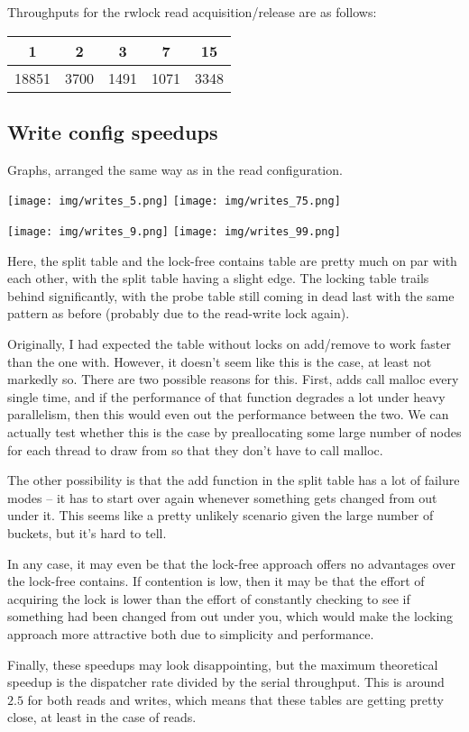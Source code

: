 \documentclass{article}
\begin{document}
Throughputs for the rwlock read acquisition/release are as follows:

\begin{tabular}{ccccc}
    1&2&3&7&15\\
    \hline
    18851&3700&1491&1071&3348\\
\end{tabular}

\subsection*{Write config speedups}
Graphs, arranged the same way as in the read configuration.

\texttt{[image: img/writes\_5.png]}
\texttt{[image: img/writes\_75.png]}

\texttt{[image: img/writes\_9.png]}
\texttt{[image: img/writes\_99.png]}

Here, the split table and the lock-free contains table are pretty much on par with each other, with the split table having a slight edge. The locking table trails behind significantly, with the probe table still coming in dead last with the same pattern as before (probably due to the read-write lock again). 

Originally, I had expected the table without locks on add/remove to work faster than the one with. However, it doesn't seem like this is the case, at least not markedly so. There are two possible reasons for this. First, adds call malloc every single time, and if the performance of that function degrades a lot under heavy parallelism, then this would even out the performance between the two. We can actually test whether this is the case by preallocating some large number of nodes for each thread to draw from so that they don't have to call malloc.

The other possibility is that the add function in the split table has a lot of failure modes -- it has to start over again whenever something gets changed from out under it. This seems like a pretty unlikely scenario given the large number of buckets, but it's hard to tell.

In any case, it may even be that the lock-free approach offers no advantages over the lock-free contains. If contention is low, then it may be that the effort of acquiring the lock is lower than the effort of constantly checking to see if something had been changed from out under you, which would make the locking approach more attractive both due to simplicity and performance.

Finally, these speedups may look disappointing, but the maximum theoretical speedup is the dispatcher rate divided by the serial throughput. This is around $2.5$ for both reads and writes, which means that these tables are getting pretty close, at least in the case of reads.
\end{document}

